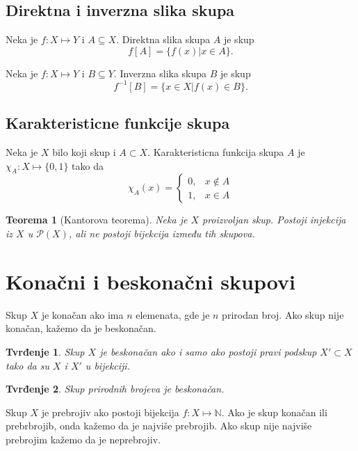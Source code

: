 \documentclass[12p,14paper]{article}
\newtheorem*{theorem}{Teorema}
\newtheorem*{prop}{Tvrđenje}
\begin{document}
\begin{multicols}{2}
\subsection{Direktna i inverzna slika skupa}

    Neka je $f: X \mapsto Y$ i $A \subseteq X$. Direktna slika skupa $A$ 
    je skup
    \[f[A] = \{f(x) | x \in A\}.\]
    
    Neka je $f: X \mapsto Y$ i $B \subseteq Y$. Inverzna slika skupa $B$ 
    je skup
    \[f^{-1}[B] = \{x \in X | f(x) \in B\}.\]

\subsection{Karakteristicne funkcije skupa}

    Neka je $X$ bilo koji skup i $A \subset X$. Karakteristicna funkcija skupa
    $A$ je $\chi_A : X \mapsto \{0, 1\}$ tako da
    \[
        \chi_A (x) = 
        \begin{cases}
            0, & x \notin A \\
            1, & x \in A
        \end{cases}
    \]

    \begin{theorem}[Kantorova teorema]
        Neka je $X$ proizvoljan skup. Postoji injekcija iz $X$ u 
        $\mathcal{P} (X)$, ali ne postoji bijekcija između tih skupova.
    \end{theorem}

\section{Konačni i beskonačni skupovi}

    Skup $X$ je konačan ako ima $n$ elemenata, gde je $n$ prirodan broj. Ako
    skup nije konačan, kažemo da je beskonačan.

    \begin{prop}
        Skup $X$ je beskonačan ako i samo ako postoji pravi podskup 
        $X' \subset X$ tako da su $X$ i $X'$ u bijekciji.
    \end{prop}

    \begin{prop}
        Skup prirodnih brojeva je beskonačan.
    \end{prop}

    Skup $X$ je prebrojiv ako postoji bijekcija $f : X \mapsto \mathbb{N}$. 
    Ako je skup konačan ili prebrbrojib, onda kažemo da je najviše prebrojib. 
    Ako skup nije najviše prebrojim kažemo da je neprebrojiv.


\end{multicols}
\end{document}
